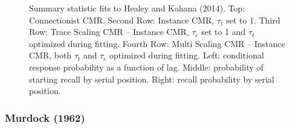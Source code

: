 \documentclass[
  letterpaper,
  11pt,
  english,
  singlespacing,
  headsepline]{MastersDoctoralThesis}
\begin{document}
\begin{figure}
\caption{\label{fig-healey2014memory}Summary statistic fits to Healey
and Kahana (2014). Top: Connectionist CMR. Second Row: Instance CMR,
\(\tau_{t}\) set to 1. Third Row: Trace Scaling CMR -- Instance CMR,
\(\tau_{c}\) set to 1 and \(\tau_{t}\) optimized during fitting. Fourth
Row: Multi Scaling CMR -- Instance CMR, both \(\tau_{t}\) and
\(\tau_{c}\) optimized during fitting. Left: conditional response
probability as a function of lag. Middle: probability of starting recall
by serial position. Right: recall probability by serial position.}

\end{figure}%

\newpage{}

\subsubsection{Murdock (1962)}\label{murdock-1962}
\end{document}
